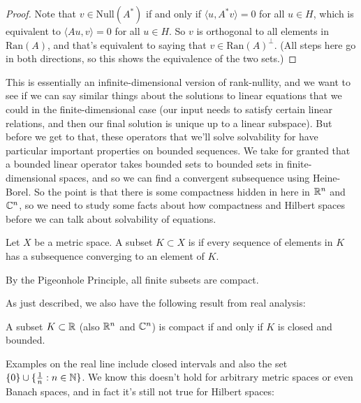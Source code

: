 \begin{proof}
Note that $v \in \text{Null}(A^\ast)$ if and only if $\langle u, A^\ast v \rangle = 0$ for all $u \in H$, which is equivalent to $\langle Au, v \rangle = 0$ for all $u \in H$. So $v$ is orthogonal to all elements in $\text{Ran}(A)$, and that's equivalent to saying that $v \in \text{Ran}(A)^\perp$. (All steps here go in both directions, so this shows the equivalence of the two sets.)
\end{proof}

This is essentially an infinite-dimensional version of rank-nullity, and we want to see if we can say similar things about the solutions to linear equations that we could in the finite-dimensional case (our input needs to satisfy certain linear relations, and then our final solution is unique up to a linear subspace). But before we get to that, these operators that we'll solve solvability for have particular important properties on bounded sequences. We take for granted that a bounded linear operator takes bounded sets to bounded sets in finite-dimensional spaces, and so we can find a convergent subsequence using Heine-Borel. So the point is that there is some compactness hidden in here in $\mathbb R^n$ and $\mathbb C^n$, so we need to study some facts about how compactness and Hilbert spaces before we can talk about solvability of equations.

\begin{definition}
Let $X$ be a metric space. A subset $K \subset X$ is  if every sequence of elements in $K$ has a subsequence converging to an element of $K$. 
\end{definition}

\begin{example}
By the Pigeonhole Principle, all finite subsets are compact.
\end{example}

As just described, we also have the following result from real analysis:

\begin{theorem}
A subset $K \subset \mathbb R$ (also $\mathbb R^n$ and $\mathbb C^n$) is compact if and only if $K$ is closed and bounded.
\end{theorem}

Examples on the real line include closed intervals and also the set $\{0\} \cup \{\frac{1}{n}: n \in \mathbb N\}$. We know this doesn't hold for arbitrary metric spaces or even Banach spaces, and in fact it's still not true for Hilbert spaces:

